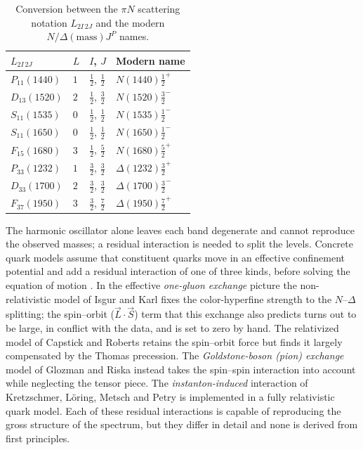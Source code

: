 \begin{table}[htbp]
    \centering
    \caption{Conversion between the $\pi N$ scattering notation $L_{2I\,2J}$ and the
    modern $N/\Delta(\text{mass})J^{P}$ names.}
    \label{tab:l2i2j}
    \begin{tabular}{llll}
        \hline
        $L_{2I\,2J}$ & $L$ & $I$, $J$ & Modern name \\
        \hline
        $P_{11}(1440)$ & $1$ & $\tfrac12$, $\tfrac12$ & $N(1440)\tfrac12^{+}$ \\
        $D_{13}(1520)$ & $2$ & $\tfrac12$, $\tfrac32$ & $N(1520)\tfrac32^{-}$ \\
        $S_{11}(1535)$ & $0$ & $\tfrac12$, $\tfrac12$ & $N(1535)\tfrac12^{-}$ \\
        $S_{11}(1650)$ & $0$ & $\tfrac12$, $\tfrac12$ & $N(1650)\tfrac12^{-}$ \\
        $F_{15}(1680)$ & $3$ & $\tfrac12$, $\tfrac52$ & $N(1680)\tfrac52^{+}$ \\
        $P_{33}(1232)$ & $1$ & $\tfrac32$, $\tfrac32$ & $\Delta(1232)\tfrac32^{+}$ \\
        $D_{33}(1700)$ & $2$ & $\tfrac32$, $\tfrac32$ & $\Delta(1700)\tfrac32^{-}$ \\
        $F_{37}(1950)$ & $3$ & $\tfrac32$, $\tfrac72$ & $\Delta(1950)\tfrac72^{+}$ \\
        \hline
    \end{tabular}
\end{table}

The harmonic oscillator alone leaves each band degenerate and cannot reproduce the
observed masses; a residual interaction is needed to split the levels. Concrete quark
models assume that constituent quarks move in an effective confinement potential and add a
residual interaction of one of three kinds, before solving the equation of motion
\cite[Ch.~15]{Amsler2018}. In the effective \emph{one-gluon exchange} picture the
non-relativistic model of Isgur and Karl fixes the color-hyperfine strength to the
$N$--$\Delta$ splitting; the spin--orbit ($\vec L\cdot\vec S$) term that this exchange also
predicts turns out to be large, in conflict with the data, and is set to zero by hand. The
relativized model of Capstick and Roberts retains the spin--orbit force but finds it
largely compensated by the Thomas precession. The \emph{Goldstone-boson (pion) exchange}
model of Glozman and Riska instead takes the spin--spin interaction into account while
neglecting the tensor piece. The \emph{instanton-induced} interaction of Kretzschmer,
L\"oring, Metsch and Petry is implemented in a fully relativistic quark model. Each of
these residual interactions is capable of reproducing the gross structure of the spectrum,
but they differ in detail and none is derived from first principles.

